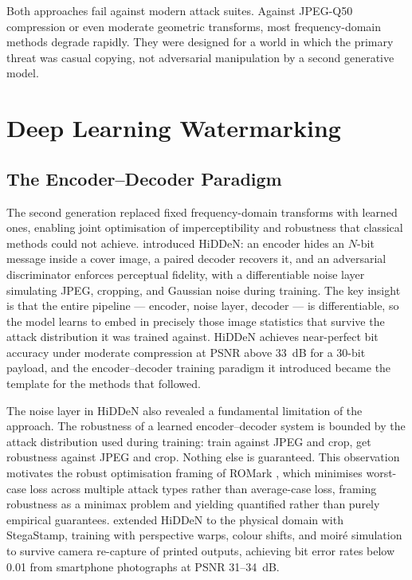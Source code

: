 ﻿\documentclass[12pt, a4paper, twoside]{report}
\numberwithin{equation}{chapter}
\begin{document}
Both approaches fail against modern attack suites. Against JPEG-Q50 compression or even moderate geometric transforms, most frequency-domain methods degrade rapidly. They were designed for a world in which the primary threat was casual copying, not adversarial manipulation by a second generative model.

\section{Deep Learning Watermarking}

\subsection*{The Encoder--Decoder Paradigm}

The second generation replaced fixed frequency-domain transforms with learned ones, enabling joint optimisation of imperceptibility and robustness that classical methods could not achieve. \cite{zhu2018} introduced HiDDeN: an encoder hides an $N$-bit message inside a cover image, a paired decoder recovers it, and an adversarial discriminator enforces perceptual fidelity, with a differentiable noise layer simulating JPEG, cropping, and Gaussian noise during training. The key insight is that the entire pipeline --- encoder, noise layer, decoder --- is differentiable, so the model learns to embed in precisely those image statistics that survive the attack distribution it was trained against. HiDDeN achieves near-perfect bit accuracy under moderate compression at PSNR above 33~dB for a 30-bit payload, and the encoder--decoder training paradigm it introduced became the template for the methods that followed.

The noise layer in HiDDeN also revealed a fundamental limitation of the approach. The robustness of a learned encoder--decoder system is bounded by the attack distribution used during training: train against JPEG and crop, get robustness against JPEG and crop. Nothing else is guaranteed. This observation motivates the robust optimisation framing of ROMark \cite{wen2019}, which minimises worst-case loss across multiple attack types rather than average-case loss, framing robustness as a minimax problem and yielding quantified rather than purely empirical guarantees. \cite{tancik2020} extended HiDDeN to the physical domain with StegaStamp, training with perspective warps, colour shifts, and moir\'{e} simulation to survive camera re-capture of printed outputs, achieving bit error rates below 0.01 from smartphone photographs at PSNR 31--34~dB.
\end{document}
